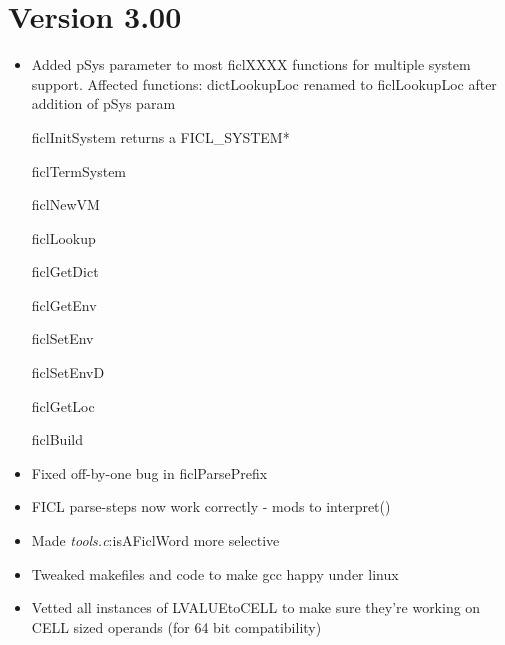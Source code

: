 \section*{Version 3.00}
\begin{itemize}[noitemsep]
	\item Added pSys parameter to most ficlXXXX functions for
	multiple system support. Affected functions:
		\subitem dictLookupLoc renamed to ficlLookupLoc after
		addition of pSys param

		\subitem ficlInitSystem returns a FICL\_SYSTEM*

		\subitem ficlTermSystem

		\subitem ficlNewVM

		\subitem ficlLookup

		\subitem ficlGetDict

		\subitem ficlGetEnv

		\subitem ficlSetEnv

		\subitem ficlSetEnvD

		\subitem ficlGetLoc

		\subitem ficlBuild
	\item Fixed off-by-one bug in ficlParsePrefix

	\item FICL parse-steps now work correctly - mods to interpret()

	\item Made \textit{tools.c}:isAFiclWord more selective

	\item Tweaked makefiles and code to make gcc happy under linux

	\item Vetted all instances of LVALUEtoCELL to make sure they're
	working on CELL sized operands (for 64 bit compatibility)
\end{itemize}


